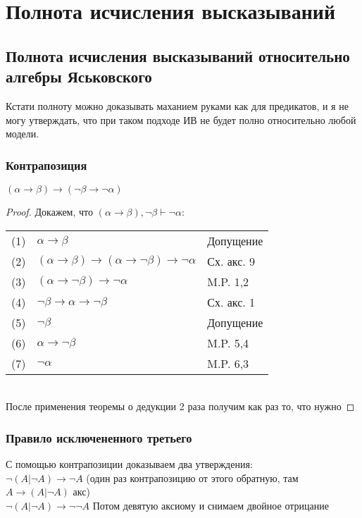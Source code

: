 \section{Полнота исчисления высказываний}
\label{sec-4}
\subsection{Полнота исчисления высказываний относительно алгебры Яськовского}
\label{sec-4-1}
Кстати полноту можно доказывать маханием руками как для предикатов,
и я не могу утверждать, что при таком подходе ИВ не будет полно
относительно любой модели.
\subsubsection{Контрапозиция}
\label{sec-4-1-1}
\begin{lemma}
    $(\alpha \to \beta) \to (\lnot \beta \to \lnot \alpha)$
\end{lemma}
\begin{proof}
    Докажем, что $(\alpha \to \beta), \lnot \beta \vdash \lnot \alpha$:\\
    \begin{tabular}{lll}
    (1) & $\alpha \to \beta$& Допущение\\
    (2) & $(\alpha \to \beta) \to (\alpha \to \lnot \beta) \to \lnot \alpha$& Сх. акс. 9\\
    (3) & $(\alpha \to \lnot \beta) \to \lnot \alpha$& M.P. 1,2\\
    (4) & $\lnot \beta \to \alpha \to \lnot \beta$& Сх. акс. 1\\
    (5) & $\lnot \beta$& Допущение\\
    (6) & $\alpha \to \lnot \beta$& M.P. 5,4\\
    (7) & $\lnot \alpha$& M.P. 6,3\\
    \end{tabular}\\
    После применения теоремы о дедукции 2 раза получим как раз то, что нужно
\end{proof}
\subsubsection{Правило исключененного третьего}
\label{sec-4-1-2}
С помощью контрапозиции доказываем два утверждения:\\
$\lnot (A|\lnot A)\to \lnot A$ (один раз контрапозицию от этого обратную, там $A\to (A|\lnot A)$ акс) \\
$\lnot (A|\lnot A)\to \lnot \lnot A$
Потом девятую аксиому и снимаем двойное отрицание

